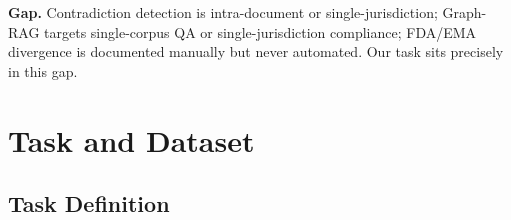 \documentclass[manuscript]{acmart}
\begin{document}
\textbf{Gap.} Contradiction detection is intra-document or
single-jurisdiction; Graph-RAG targets single-corpus QA or
single-jurisdiction compliance; FDA/EMA divergence is documented manually but
never automated. Our task sits precisely in this gap.

\section{Task and Dataset}

\subsection{Task Definition}
\label{sec:taskdef}
\end{document}
